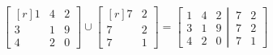 \documentclass[12 pt]{slides}
\begin{document}
\begingroup
\[\begin{bmatrix*}[r]1 & 4 & 2\\3 & 1 & 9\\4 & 2 & 0\end{bmatrix*} \cup 
	\begin{bmatrix*}[r]7 & 2\\7 & 2\\7 & 1\end{bmatrix*} = 
		\left[
			\begin{matrix}1 & 4 & 2 \\
				       3 & 1 & 9 \\
                                       4 & 2 & 0 
			\end{matrix}
			\left|
			\,
			\begin{matrix}7 & 2 \\
                                      7 & 2 \\
                                      7 & 1
			\end{matrix}
		\right.
	\right] \]
\endgroup
\end{document}
